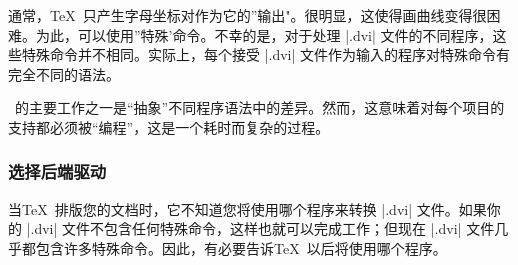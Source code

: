 
通常，\TeX\ 只产生字母坐标对作为它的''输出"。很明显，这使得画曲线变得很困难。为此，可以使用''特殊'命令。不幸的是，对于处理 |.dvi| 文件的不同程序，这些特殊命令并不相同。实际上，每个接受 |.dvi| 文件作为输入的程序对特殊命令有完全不同的语法。


\pgfname\ 的主要工作之一是``抽象''不同程序语法中的差异。然而，这意味着对每个项目的支持都必须被``编程''，这是一个耗时而复杂的过程。


\subsubsection{选择后端驱动}


当\TeX\ 排版您的文档时，它不知道您将使用哪个程序来转换 |.dvi| 文件。如果你的 |.dvi| 文件不包含任何特殊命令，这样也就可以完成工作；但现在 |.dvi| 文件几乎都包含许多特殊命令。因此，有必要告诉\TeX\ 以后将使用哪个程序。


